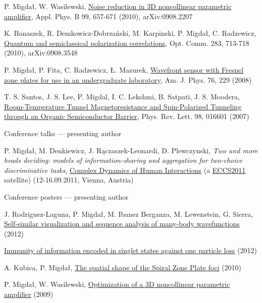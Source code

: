 \documentclass[margin,line]{resume}
\begin{document}
\begin{resume}
\begin{list2}
        \item P. Migdał, W. Wasilewski, \href{http://dx.doi.org/10.1007/s00340-010-3915-z}{Noise reduction in 3D noncollinear parametric amplifier}, Appl. Phys. B 99, 657-671 (2010), arXiv:0908.2207
        \item K. Banaszek, R. Demkowicz-Dobrzański, M. Karpinski, P. Migdał, C. Radzewicz, \href{http://arxiv.org/abs/0908.3548}{Quantum and semiclassical polarization correlations}, Opt. Comm. 283, 713-718 (2010), arXiv:0908.3548
        \item P. Migdał, P. Fita, C. Radzewicz, Ł. Mazurek, \href{http://ultrafast.fuw.edu.pl/publications/ajp_2008.pdf}{Wavefront sensor with Fresnel zone plates for use in an undergraduate laboratory}, Am. J. Phys. 76, 229 (2008)
        \item T. S. Santos, J. S. Lee, P. Migdal, I. C. Lekshmi, B. Satpati, J. S. Moodera, \href{http://dx.doi.org/10.1103/PhysRevLett.98.016601}{Room-Temperature Tunnel Magnetoresistance and Spin-Polarized Tunneling through an Organic Semiconductor Barrier}, Phys. Rev. Lett. 98, 016601 (2007)
    \end{list2}

    Conference talks --- presenting author
     \begin{list2}
        \item P. Migdał, M. Denkiewicz, J. Rączaszek-Leonardi, D. Plewczynski, {\sl Two and more heads deciding: models of information-sharing and aggregation for two-choice discriminative tasks}, \href{http://markov.uc3m.es/complexdynamics11/Home.html}{Complex Dynamics of Human Interactions} (a \href{http://www.eccs2011.eu/}{ECCS2011} satellite) (12-16.09.2011, Vienna, Austria)
    \end{list2}   

    Conference posters --- presenting author
    \begin{list2}
        \item J. Rodriguez-Laguna, P. Migdał, M. Ibanez Berganza, M. Lewenstein, G. Sierra, \href{http://dx.doi.org/10.6084/m9.figshare.97233}{Self-similar visualization and sequence analysis of many-body wavefunctions} (2012)
        \item \href{http://dx.doi.org/10.6084/m9.figshare.97235}{Immunity of information encoded in singlet states against one particle loss} (2012)
        \item A. Kubica, P. Migdał, \href{http://dx.doi.org/10.6084/m9.figshare.97236}{The spatial shape of the Spiral Zone Plate foci} (2010)
        \item P. Migdał, W. Wasilewski, \href{http://dx.doi.org/10.6084/m9.figshare.97237}{Optimization of a 3D noncollinear parametric amplifier} (2009)
    \end{list2}
    

\end{resume}
\end{document}
